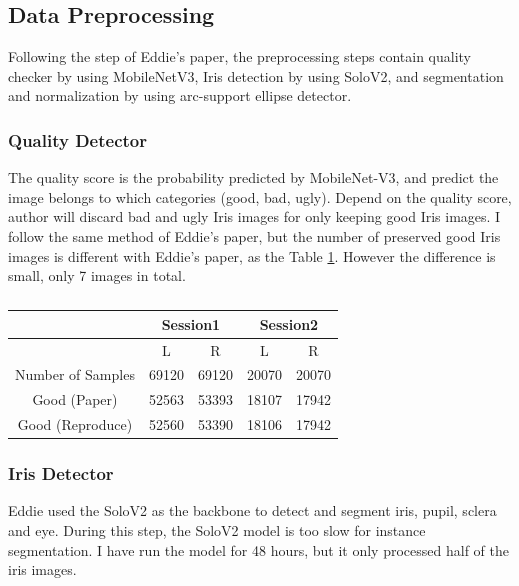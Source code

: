 \subsection{Data Preprocessing}
Following the step of Eddie's paper, the preprocessing steps contain quality checker by using MobileNetV3, Iris detection by using SoloV2, and segmentation and normalization by using arc-support ellipse detector.
\subsubsection{Quality Detector}
The quality score is the probability predicted by MobileNet-V3, and predict the image belongs to which categories (good, bad, ugly). Depend on the quality score, author will discard bad and ugly Iris images for only keeping good Iris images. I follow the same method of Eddie's paper, but the number of preserved good Iris images is different with Eddie's paper, as the Table \ref{qulity-checker}. However the difference is small, only 7 images in total.

\begin{table}[h]
    \centering
    \caption{}
    \begin{tabular}{ccccc}
    \hline
                      & \multicolumn{2}{c}{Session1} & \multicolumn{2}{c}{Session2} \\ \hline
                      & L             & R            & L             & R            \\ \hline
    Number of Samples & 69120         & 69120        & 20070         & 20070        \\
    Good (Paper)      & 52563         & 53393        & 18107         & 17942        \\
    Good (Reproduce)  & 52560         & 53390        & 18106         & 17942        \\ \hline
    \end{tabular}
    \label{qulity-checker}
\end{table}

\subsubsection{Iris Detector}
Eddie used the SoloV2 as the backbone to detect and segment iris, pupil, sclera and eye. During this step, the SoloV2 model is too slow for instance segmentation. I have run the model for 48 hours, but it only processed half of the iris images.


